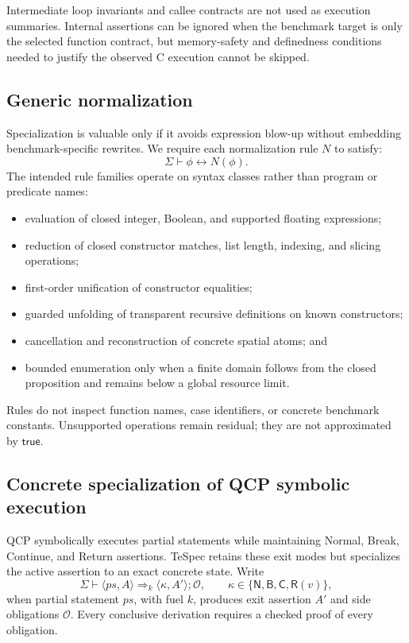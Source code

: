 \documentclass[10pt]{article}
\newcommand{\true}{\mathsf{true}}
\newcommand{\ctx}{\Sigma}
\begin{document}
Intermediate loop invariants and callee contracts are not used as execution
summaries.  Internal assertions can be ignored when the benchmark target is
only the selected function contract, but memory-safety and definedness
conditions needed to justify the observed C execution cannot be skipped.

\subsection{Generic normalization}

Specialization is valuable only if it avoids expression blow-up without
embedding benchmark-specific rewrites.  We require each normalization rule
$N$ to satisfy:
\[
  \ctx\vdash \phi\leftrightarrow N(\phi).
\]
The intended rule families operate on syntax classes rather than program or
predicate names:

\begin{itemize}[leftmargin=1.4em]
  \item evaluation of closed integer, Boolean, and supported floating
        expressions;
  \item reduction of closed constructor matches, list length, indexing, and
        slicing operations;
  \item first-order unification of constructor equalities;
  \item guarded unfolding of transparent recursive definitions on known
        constructors;
  \item cancellation and reconstruction of concrete spatial atoms; and
  \item bounded enumeration only when a finite domain follows from the closed
        proposition and remains below a global resource limit.
\end{itemize}

Rules do not inspect function names, case identifiers, or concrete benchmark
constants.  Unsupported operations remain residual; they are not approximated
by $\true$.

\subsection{Concrete specialization of QCP symbolic execution}

QCP symbolically executes partial statements while maintaining Normal, Break,
Continue, and Return assertions.  TeSpec retains these exit modes but
specializes the active assertion to an exact concrete state.  Write
\[
  \ctx\vdash
  \langle ps,A\rangle
  \Longrightarrow_k
  \langle\kappa,A'\rangle;\mathcal O,
  \qquad
  \kappa\in\{\mathsf N,\mathsf B,\mathsf C,\mathsf R(v)\},
\]
when partial statement $ps$, with fuel $k$, produces exit assertion $A'$ and
side obligations $\mathcal O$.  Every conclusive derivation requires a checked
proof of every obligation.
\end{document}
